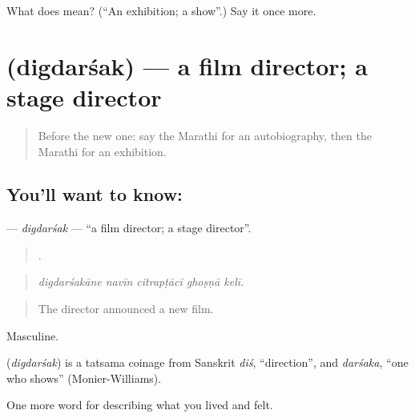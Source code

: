 \begin{tcolorbox}[breakable,colback=teal!4,colframe=teal!35!black,title={Before you move on}]
What does  mean? (\textquotedblleft{}An exhibition; a show\textquotedblright{}.) Say it once more.
\end{tcolorbox}
\section[\texorpdfstring{\mr{दिग्दर्शक} (digdarśak)}{दिग्दर्शक (digdarśak)}]{ (digdarśak) — a film director; a stage director}

\label{lesson:MR-C539-digdarsak}



\begin{quote}
Before the new one: say the Marathi for an autobiography, then the Marathi for an exhibition.
\end{quote}

\subsection*{You'll want to know: }
\textbf{} — \emph{digdarśak} — \textquotedblleft{}a film director; a stage director\textquotedblright{}.

\begin{quote}
    .
\end{quote}

\begin{quote}
\emph{digdarśakāne navīn citrapṭācī ghoṣṇā kelī.}
\end{quote}

\begin{quote}
The director announced a new film.
\end{quote}

Masculine.

\begin{cousinweb}
\textbf{} (\emph{digdarśak}) is a tatsama coinage from Sanskrit \emph{diś}, \textquotedblleft{}direction\textquotedblright{}, and \emph{darśaka}, \textquotedblleft{}one who shows\textquotedblright{} (Monier-Williams).
\end{cousinweb}

\begin{grammarlens}[title={What you've built}]
One more word for describing what you lived and felt.
\end{grammarlens}

